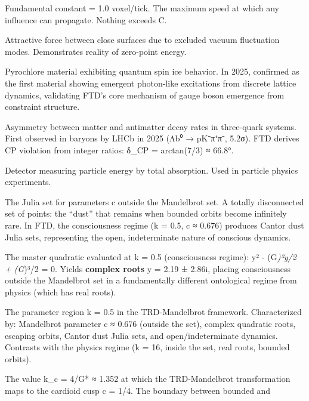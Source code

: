 \documentclass[
  11pt,
  letterpaper,
  twoside,
  openany]{book}
\providecommand{\tightlist}{%
  \setlength{\itemsep}{0pt}\setlength{\parskip}{0pt}}
\begin{document}
\begin{description}
\tightlist
\item[\textbf{C (Speed of Causality)}]
Fundamental constant = 1.0 voxel/tick. The maximum speed at which any
influence can propagate. Nothing exceeds C.
\item[\textbf{Casimir Effect}]
Attractive force between close surfaces due to excluded vacuum
fluctuation modes. Demonstrates reality of zero-point energy.
\item[\textbf{Ce₂Zr₂O₇ (Cerium Zirconium Oxide)}]
Pyrochlore material exhibiting quantum spin ice behavior. In 2025,
confirmed as the first material showing emergent photon-like excitations
from discrete lattice dynamics, validating FTD's core mechanism of gauge
boson emergence from constraint structure.
\item[\textbf{CP Violation (in Baryons)}]
Asymmetry between matter and antimatter decay rates in three-quark
systems. First observed in baryons by LHCb in 2025 (Λb⁰ → pK⁻π⁺π⁻,
5.2σ). FTD derives CP violation from integer ratios: δ\_CP = arctan(7/3)
≈ 66.8°.
\item[\textbf{Calorimeter}]
Detector measuring particle energy by total absorption. Used in particle
physics experiments.
\item[\textbf{Cantor Dust (Julia Set)}]
The Julia set for parameters c outside the Mandelbrot set. A totally
disconnected set of points: the ``dust'' that remains when bounded
orbits become infinitely rare. In FTD, the consciousness regime (k =
0.5, c ≈ 0.676) produces Cantor dust Julia sets, representing the open,
indeterminate nature of conscious dynamics.
\item[\textbf{Consciousness Quadratic}]
The master quadratic evaluated at k = 0.5 (consciousness regime): y² -
(G\emph{)²y/2 + (G})³/2 = 0. Yields \textbf{complex roots} y = 2.19 ±
2.86i, placing consciousness outside the Mandelbrot set in a
fundamentally different ontological regime from physics (which has real
roots).
\item[\textbf{Consciousness Regime}]
The parameter region k = 0.5 in the TRD-Mandelbrot framework.
Characterized by: Mandelbrot parameter c ≈ 0.676 (outside the set),
complex quadratic roots, escaping orbits, Cantor dust Julia sets, and
open/indeterminate dynamics. Contrasts with the physics regime (k = 16,
inside the set, real roots, bounded orbits).
\item[\textbf{Critical Coefficient (k\_c)}]
The value k\_c = 4/G* ≈ 1.352 at which the TRD-Mandelbrot transformation
maps to the cardioid cusp c = 1/4. The boundary between bounded and

\end{description}
\end{document}
